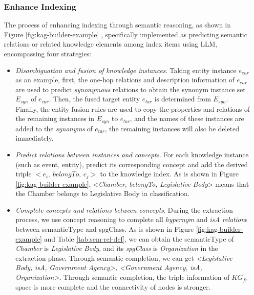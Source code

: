 \documentclass{article}
\begin{document}
\subsubsection{Enhance Indexing}
The process of enhancing indexing through semantic reasoning, as shown in Figure \ref{fig:kag-builder-example} , specifically implemented as predicting semantic relations or related knowledge elements among index items using LLM, encompassing four strategies:
\begin{itemize}
    \item \textit{Disambiguation and fusion of knowledge instances}. Taking entity instance $e_{cur}$ as an example, first, the one-hop relations and description information of $e_{cur}$ are used to predict \textit{synonymous} relations to obtain the synonym instance set $E_{syn}$ of $e_{cur}$. Then, the fused target entity $e_{tar}$ is determined from $E_{syn}$. Finally, the entity fusion rules are used to copy the properties and relations of the remaining instances in $E_{syn}$ to $e_{tar}$, and the names of these instances are added to the \textit{synonyms} of $e_{tar}$, the remaining instances will also be deleted immediately.
    \item \textit{Predict relations between instances and concepts}. For each knowledge instance (such as event, entity), predict its corresponding concept and add the derived triple $<e_i,\ belongTo,\ c_j>$ to the knowledge index. As is shown in Figure \ref{fig:kag-builder-example}, <\textit{Chamber, belongTo, Legislative Body}> means that the Chamber belongs to Legislative Body in classification.
    \item \textit{Complete concepts and relations between concepts}. During the extraction process, we use concept reasoning to complete all \textit{hypernym} and \textit{isA relation}s between semanticType and spgClass. As is shown in Figure \ref{fig:kag-builder-example} and Table \ref{tab:sem-rel-def}, we can obtain the semanticType of \textit{Chamber} is \textit{Legislative Body}, and its \textit{spgClass} is \textit{Organization} in the extraction phase. Through semantic completion, we can get \textit{<Legislative Body, isA, Government Agency>, <Government Agency, isA, Organization>}. Through semantic completion, the triple information of $KG_{fr}$ space is more complete and the connectivity of nodes is stronger.
\end{itemize}
\end{document}
